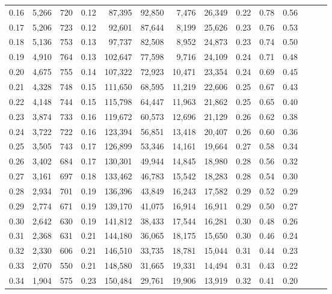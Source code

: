 \begin{tabular}{rrrrrrrrrrrrrr}
0.16 &  5,266 &  720 &  0.12 &   87,395 &   92,850 &   7,476 &  26,349 &  0.22 &  0.78 &      0.56 \\
0.17 &  5,206 &  723 &  0.12 &   92,601 &   87,644 &   8,199 &  25,626 &  0.23 &  0.76 &      0.53 \\
0.18 &  5,136 &  753 &  0.13 &   97,737 &   82,508 &   8,952 &  24,873 &  0.23 &  0.74 &      0.50 \\
0.19 &  4,910 &  764 &  0.13 &  102,647 &   77,598 &   9,716 &  24,109 &  0.24 &  0.71 &      0.48 \\
0.20 &  4,675 &  755 &  0.14 &  107,322 &   72,923 &  10,471 &  23,354 &  0.24 &  0.69 &      0.45 \\
0.21 &  4,328 &  748 &  0.15 &  111,650 &   68,595 &  11,219 &  22,606 &  0.25 &  0.67 &      0.43 \\
0.22 &  4,148 &  744 &  0.15 &  115,798 &   64,447 &  11,963 &  21,862 &  0.25 &  0.65 &      0.40 \\
0.23 &  3,874 &  733 &  0.16 &  119,672 &   60,573 &  12,696 &  21,129 &  0.26 &  0.62 &      0.38 \\
0.24 &  3,722 &  722 &  0.16 &  123,394 &   56,851 &  13,418 &  20,407 &  0.26 &  0.60 &      0.36 \\
0.25 &  3,505 &  743 &  0.17 &  126,899 &   53,346 &  14,161 &  19,664 &  0.27 &  0.58 &      0.34 \\
0.26 &  3,402 &  684 &  0.17 &  130,301 &   49,944 &  14,845 &  18,980 &  0.28 &  0.56 &      0.32 \\
0.27 &  3,161 &  697 &  0.18 &  133,462 &   46,783 &  15,542 &  18,283 &  0.28 &  0.54 &      0.30 \\
0.28 &  2,934 &  701 &  0.19 &  136,396 &   43,849 &  16,243 &  17,582 &  0.29 &  0.52 &      0.29 \\
0.29 &  2,774 &  671 &  0.19 &  139,170 &   41,075 &  16,914 &  16,911 &  0.29 &  0.50 &      0.27 \\
0.30 &  2,642 &  630 &  0.19 &  141,812 &   38,433 &  17,544 &  16,281 &  0.30 &  0.48 &      0.26 \\
0.31 &  2,368 &  631 &  0.21 &  144,180 &   36,065 &  18,175 &  15,650 &  0.30 &  0.46 &      0.24 \\
0.32 &  2,330 &  606 &  0.21 &  146,510 &   33,735 &  18,781 &  15,044 &  0.31 &  0.44 &      0.23 \\
0.33 &  2,070 &  550 &  0.21 &  148,580 &   31,665 &  19,331 &  14,494 &  0.31 &  0.43 &      0.22 \\
0.34 &  1,904 &  575 &  0.23 &  150,484 &   29,761 &  19,906 &  13,919 &  0.32 &  0.41 &      0.20 \\

\end{tabular}
